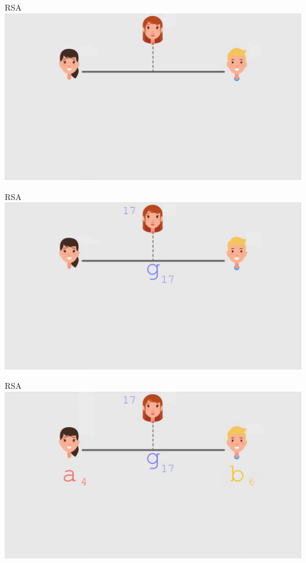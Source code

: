 \documentclass{beamer}
\begin{document}
\begin{frame}{RSA}
    \centering
    \includegraphics[width=\textwidth, height=0.9\textheight, keepaspectratio]{rsa 1.png}
\end{frame}

\begin{frame}{RSA}
    \centering
    \includegraphics[width=\textwidth, height=0.9\textheight, keepaspectratio]{rsa 2.png}
\end{frame}

\begin{frame}{RSA}
    \centering
    \includegraphics[width=\textwidth, height=0.9\textheight, keepaspectratio]{rsa 3.png}
\end{frame}
\end{document}
